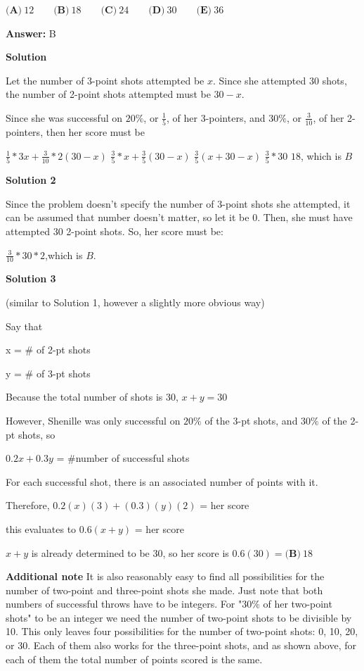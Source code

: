 \begin{enumerate}
 $\textbf{(A)}\ 12\qquad\textbf{(B)}\ 18\qquad\textbf{(C)}\ 24\qquad\textbf{(D)}\ 30\qquad\textbf{(E)}\ 36$

 \textbf{Answer: }B



\textbf{Solution}

Let the number of 3-point shots attempted be $x$. Since she attempted 30 shots, the number of 2-point shots attempted must be $30 - x$.

 Since she was successful on $20\%$, or $\frac{1}{5}$, of her 3-pointers, and $30\%$, or $\frac{3}{10}$, of her 2-pointers, then her score must be

 $\frac{1}{5}*3x + \frac{3}{10}*2(30-x)$
$\frac{3}{5}*x + \frac{3}{5}(30-x)$
$\frac{3}{5}(x+30-x)$
$\frac{3}{5}*30$
$18$, which is $B$




\textbf{Solution 2}

Since the problem doesn't specify the number of 3-point shots she attempted, it can be assumed that number doesn't matter, so let it be $0$. Then, she must have attempted $30$ 2-point shots. So, her score must be:

 $\frac{3}{10}*30*2$,which is $B$.

 



\textbf{Solution 3}

(similar to Solution 1, however a slightly more obvious way)

 Say that 

 x = \# of 2-pt shots

 y = \# of 3-pt shots

 Because the total number of shots is $30$, $x + y = 30$

 However, Shenille was only successful on $20\%$ of the 3-pt shots, and $30\%$ of the 2-pt shots, so 

 $0.2x + 0.3y$ = \#number of successful shots

 For each successful shot, there is an associated number of points with it. 

 Therefore, $0.2(x)(3) + (0.3)(y)(2)$ = her score

 this evaluates to $0.6 (x + y)$ = her score

 $x + y$ is already determined to be 30, so her score is $0.6 (30) = \boxed{\textbf{(B)}\ 18}$

 \textbf{Additional note} It is also reasonably easy to find all possibilities for the number of two-point and three-point shots she made. Just note that both numbers of successful throws have to be integers. For "$30\%$ of her two-point shots" to be an integer we need the number of two-point shots to be divisible by 10. This only leaves four possibilities for the number of two-point shots: 0, 10, 20, or 30. Each of them also works for the three-point shots, and as shown above, for each of them the total number of points scored is the same.


\end{enumerate}

